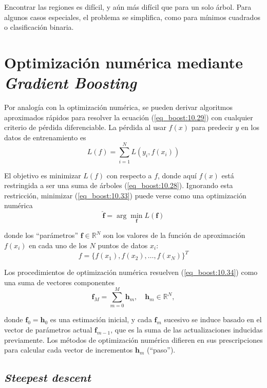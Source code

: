 Encontrar las regiones es difícil, y aún más difícil que para un solo árbol. Para algunos casos especiales, el problema se simplifica, como para mínimos cuadrados o clasificación binaria.

\section{Optimización numérica mediante \textit{Gradient Boosting}}

Por analogía con la optimización numérica, se pueden derivar algoritmos aproximados rápidos para resolver la ecuación (\ref{eq_boost:10.29}) con cualquier criterio de pérdida diferenciable. La pérdida al usar $f(x)$ para predecir $y$ en los datos de entrenamiento es
\begin{equation}
L(f) = \sum_{i=1}^{N} L(y_i, f(x_i))
\label{eq_boost:10.33}
\end{equation}

El objetivo es minimizar $L(f)$ con respecto a $f$, donde aquí $f(x)$ está restringida a ser una suma de árboles (\ref{eq_boost:10.28}). Ignorando esta restricción, minimizar (\ref{eq_boost:10.33}) puede verse como una optimización numérica
\begin{equation}
\hat{\mathbf{f}} = \arg\min_\mathbf{f} L(\mathbf{f})
\label{eq_boost:10.34}
\end{equation}

\noindent donde los ``parámetros'' $\mathbf{f} \in \mathbb{R}^N$ son los valores de la función de aproximación $f(x_i)$ en cada uno de los $N$ puntos de datos $x_i$:
\begin{equation}
f = \{f(x_1), f(x_2), \dots, f(x_N)\}^T
\end{equation}

Los procedimientos de optimización numérica resuelven (\ref{eq_boost:10.34}) como una suma de vectores componentes
\begin{equation}
\mathbf{f}_M = \sum_{m=0}^{M} \mathbf{h}_m, \quad \mathbf{h}_m \in \mathbb{R}^N,
\end{equation}

\noindent donde $\mathbf{f}_0 = \mathbf{h}_0$ es una estimación inicial, y cada $\mathbf{f}_m$ sucesivo se induce basado en el vector de parámetros actual $\mathbf{f}_{m-1}$, que es la suma de las actualizaciones inducidas previamente. Los métodos de optimización numérica difieren en sus prescripciones para calcular cada vector de incrementos $\mathbf{h}_m$ (``paso'').

\subsection{\textit{Steepest descent}}

